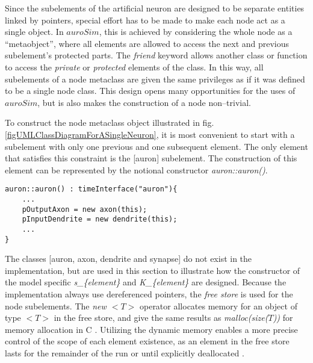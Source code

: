			Since the subelements of the artificial neuron are designed to be separate entities linked by pointers, special effort has to be made to make each node act as a single object.
			In $auroSim$, this is achieved by considering the whole node as a ``metaobject'', where all elements are allowed to access the next and previous subelement's protected parts.
			The \emph{friend} keyword allows another class or function to access the \emph{private} or \emph{protected} elements of the class. %
			In this way, all subelements of a node metaclass are given the same privileges as if it was defined to be a single node class.
			This design opens many opportunities for the uses of $auroSim$, but is also makes the construction of a node non--trivial.

			
			To construct the node metaclass object illustrated in fig. \ref{figUMLClassDiagramForASingleNeuron}, it is most convenient to start with a subelement with only one previous and one subsequent element. %
			The only element that satisfies this constraint is the [auron] subelement.			
			The construction of this element can be represented by the notional constructor \emph{auron::auron()}.
\begin{lstlisting}
auron::auron() : timeInterface("auron"){
	...
	pOutputAxon = new axon(this);
	pInputDendrite = new dendrite(this);
	...
}
\end{lstlisting}
			The classes [auron, axon, dendrite and synapse] do not exist in the implementation, but are used in this section to illustrate how the constructor of the model specific
				\emph{s\_\{element\}} and \emph{K\_\{element\}} are designed.
			Because the implementation always use dereferenced pointers, the \emph{free store} is used for the node subelements.
			The \emph{new $<T>$} operator allocates memory for an object of type $<T>$ in the free store, and give the same results as \emph{malloc(size($T$))} for memory allocation in C \cite{Stroustrup2000}. %
			Utilizing the dynamic memory enables a more precise control of the scope of each element existence, 
				as an element in the free store lasts for the remainder of the run or until explicitly deallocated \cite[Appendix~C.9]{Stroustrup2000}.


